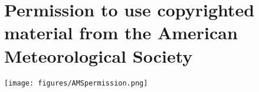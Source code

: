  
\chapter{Permission to use copyrighted material from the American Meteorological Society}
\label{chapter:appendix}
\resetfootnote %

\begin{figure*}[ht]
\centerline{\texttt{[image: figures/AMSpermission.png]}}
\label{fig:amspermission}
\end{figure*}
